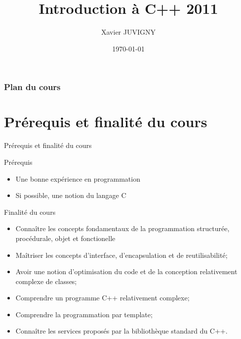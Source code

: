 \documentclass[handout,10pt]{beamer}
\title[C++\hspace{2em}]{Introduction à C++ 2011}
\author[Xavier JUVIGNY]{Xavier JUVIGNY}
\date{\today}
\institute{ONERA}
\begin{document}

\begin{frame}
 \titlepage
\end{frame}

\begin{frame}
\frametitle{Plan du cours}
\tableofcontents
\end{frame}

\section{Prérequis et finalité du cours}

\begin{frame}[fragile]{Prérequis et finalité du cours}

  \begin{block}{Prérequis}
    \begin{itemize}
      \item Une bonne expérience en programmation
      \item Si possible, une notion du langage C
    \end{itemize}
  \end{block}
  
  \begin{block}{Finalité du cours}
    \begin{itemize}
    \item Connaître les concepts fondamentaux de la programmation structurée, procédurale, objet et fonctionelle
    \item Maîtriser les concepts d'interface, d'encapsulation et de reutilisabilité;
    \item Avoir une notion d'optimisation du code et de la conception relativement complexe de classes;
    \item Comprendre un programme C++ relativement complexe;
    \item Comprendre la programmation par template;
    \item Connaître les services proposés par la bibliothèque standard du C++.
    \end{itemize}
  \end{block}

\end{frame}
\end{document}
